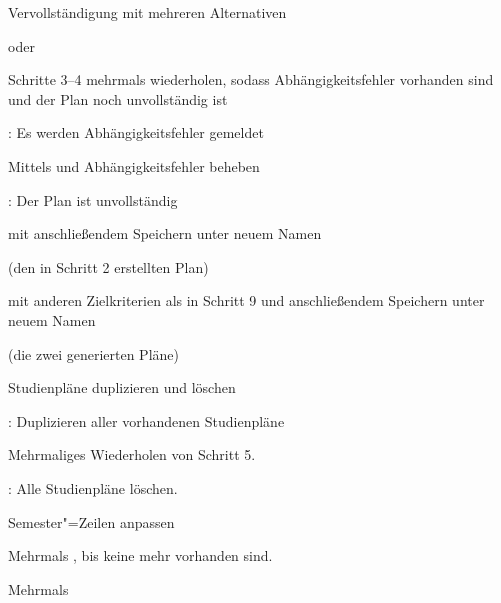 \begin{scenario}{Vervollständigung mit mehreren Alternativen}
	\item {}
	\item {}
	\item {}
	\item {} oder 
	\item Schritte 3–4 mehrmals wiederholen, sodass Abhängigkeitsfehler vorhanden sind und der Plan noch unvollständig ist
	\item {}: Es werden Abhängigkeitsfehler gemeldet
	\item Mittels  und  Abhängigkeitsfehler beheben
	\item {}: Der Plan ist unvollständig
	\item {} mit anschließendem Speichern unter neuem Namen
	\item {}
	\item {} (den in Schritt 2 erstellten Plan)
	\item {} mit anderen Zielkriterien als in Schritt 9 und anschließendem Speichern unter neuem Namen
	\item {}
	\item {} (die zwei generierten Pläne)
\end{scenario}

\begin{scenario}{Studienpläne duplizieren und löschen}
	\item {}
	\item {}
	\item {}
	\item {}
	\item {}: Duplizieren aller vorhandenen Studienpläne
	\item Mehrmaliges Wiederholen von Schritt 5.
	\item {}: Alle Studienpläne löschen.
\end{scenario}

\begin{scenario}{Semester"=Zeilen anpassen}
	\item {}
	\item {}
	\item Mehrmals , bis keine mehr vorhanden sind.
	\item Mehrmals 
	\item {}
\end{scenario}



